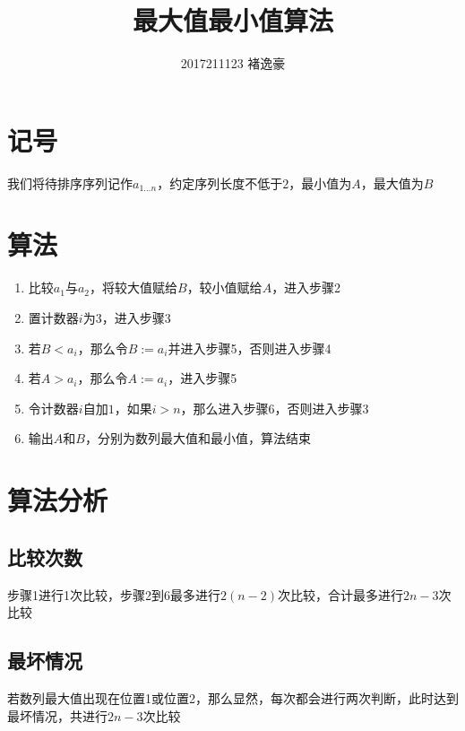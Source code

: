 \documentclass[UTF8]{ctexart}
\title{最大值最小值算法}
\author{2017211123 褚逸豪}
\begin{document}
    \maketitle
    \section{记号}
    我们将待排序序列记作$a_{1\ldots n}$，约定序列长度不低于$2$，最小值为$A$，最大值为$B$
    \section{算法}
    \begin{enumerate}
        \item 比较$a_1$与$a_2$，将较大值赋给$B$，较小值赋给$A$，进入步骤2
        \item 置计数器$i$为$3$，进入步骤3
        \item 若$B<a_i$，那么令$B:=a_i$并进入步骤5，否则进入步骤4
        \item 若$A>a_i$，那么令$A:=a_i$，进入步骤5
        \item 令计数器$i$自加$1$，如果$i>n$，那么进入步骤6，否则进入步骤3
        \item 输出$A$和$B$，分别为数列最大值和最小值，算法结束
    \end{enumerate}
    \section{算法分析}
    \subsection{比较次数}
    步骤1进行1次比较，步骤2到6最多进行$2(n-2)$次比较，合计最多进行$2n-3$次比较
    \subsection{最坏情况}
    若数列最大值出现在位置1或位置2，那么显然，每次都会进行两次判断，此时达到最坏情况，共进行$2n-3$次比较
\end{document}
